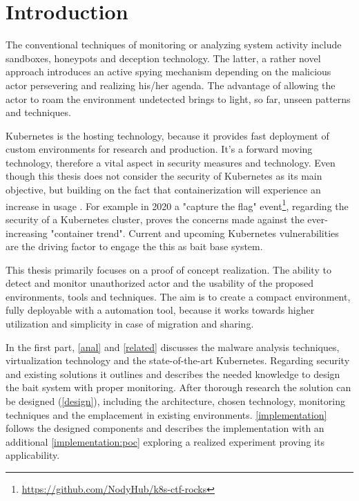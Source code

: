 \chapter{Introduction}
The conventional techniques of monitoring or analyzing system activity include sandboxes, honeypots and deception technology. The latter, a rather novel approach introduces an active spying mechanism depending on the malicious actor persevering and realizing his/her agenda. The advantage of allowing the actor to roam the environment undetected brings to light, so far, unseen patterns and techniques.

Kubernetes is the hosting technology, because it provides fast deployment of custom environments for research and production. It's a forward moving technology, therefore a vital aspect in security measures and technology. Even though this thesis does not consider the security of Kubernetes as its main objective, but building on the fact that containerization will experience an increase in usage \cite{article:container:prediction}. For example in 2020 a "capture the flag" event\footnote{\url{https://github.com/NodyHub/k8s-ctf-rocks}}, regarding the security of a Kubernetes cluster, proves the concerns made against the ever-increasing "container trend". Current and upcoming Kubernetes vulnerabilities \cite{thesis:k8s:vulnerabs} are the driving factor to engage the this as bait base system.

This thesis primarily focuses on a proof of concept realization. The ability to detect and monitor unauthorized actor and the usability of the proposed environments, tools and techniques. The aim is to create a compact environment, fully deployable with a automation tool, because it works towards higher utilization and simplicity in case of migration and sharing.

In the first part, \autoref{anal} and \autoref{related} discusses the malware analysis techniques, virtualization technology and the state-of-the-art Kubernetes. Regarding security and existing solutions it outlines and describes the needed knowledge to design the bait system with proper monitoring. After thorough research the solution can be designed (\autoref{design}), including the architecture, chosen technology, monitoring techniques and the emplacement in existing environments. \autoref{implementation} follows the designed components and describes the implementation with an additional \autoref{implementation:poc} exploring a realized experiment proving its applicability.